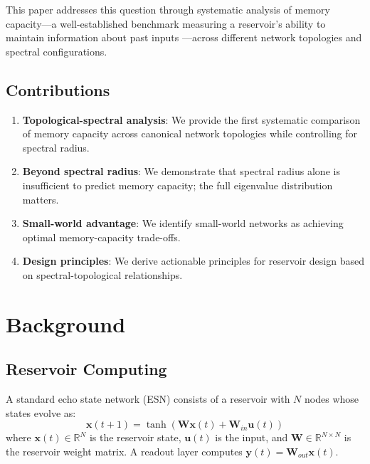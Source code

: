 \documentclass[11pt]{article}
\begin{document}
This paper addresses this question through systematic analysis of memory capacity—a well-established benchmark measuring a reservoir's ability to maintain information about past inputs \cite{jaeger2002}—across different network topologies and spectral configurations.

\subsection{Contributions}

\begin{enumerate}
\item \textbf{Topological-spectral analysis}: We provide the first systematic comparison of memory capacity across canonical network topologies while controlling for spectral radius.

\item \textbf{Beyond spectral radius}: We demonstrate that spectral radius alone is insufficient to predict memory capacity; the full eigenvalue distribution matters.

\item \textbf{Small-world advantage}: We identify small-world networks as achieving optimal memory-capacity trade-offs.

\item \textbf{Design principles}: We derive actionable principles for reservoir design based on spectral-topological relationships.
\end{enumerate}

\section{Background}

\subsection{Reservoir Computing}

A standard echo state network (ESN) consists of a reservoir with $N$ nodes whose states evolve as:
\begin{equation}
\mathbf{x}(t+1) = \tanh(\mathbf{W}\mathbf{x}(t) + \mathbf{W}_{in}\mathbf{u}(t))
\end{equation}
where $\mathbf{x}(t) \in \mathbb{R}^N$ is the reservoir state, $\mathbf{u}(t)$ is the input, and $\mathbf{W} \in \mathbb{R}^{N \times N}$ is the reservoir weight matrix. A readout layer computes $\mathbf{y}(t) = \mathbf{W}_{out}\mathbf{x}(t)$.
\end{document}
